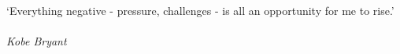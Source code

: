 
\clearpage

\narrowlinespacing

\vspace*{4mm}
\vspace*{\fill}
`Everything negative - pressure, challenges - is all an opportunity for me to rise.'\\
\\
\hfill\emph{Kobe Bryant}
\vspace*{\fill}

\normallinespacing
